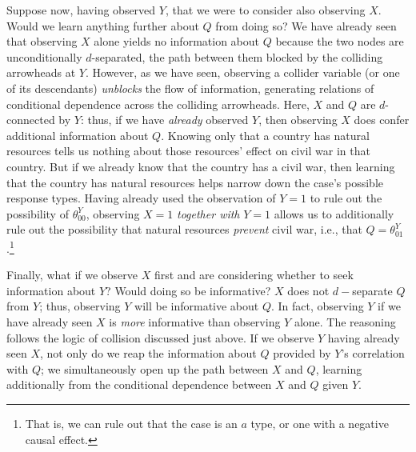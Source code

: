 \documentclass[
  12pt,
]{book}
\begin{document}
Suppose now, having observed \(Y\), that we were to consider also observing \(X\). Would we learn anything further about \(Q\) from doing so? We have already seen that observing \(X\) alone yields no information about \(Q\) because the two nodes are unconditionally \(d\)-separated, the path between them blocked by the colliding arrowheads at \(Y\). However, as we have seen, observing a collider variable (or one of its descendants) \emph{unblocks} the flow of information, generating relations of conditional dependence across the colliding arrowheads. Here, \(X\) and \(Q\) are \(d\)-connected by \(Y\): thus, if we have \emph{already} observed \(Y\), then observing \(X\) does confer additional information about \(Q\). Knowing only that a country has natural resources tells us nothing about those resources' effect on civil war in that country. But if we already know that the country has a civil war, then learning that the country has natural resources helps narrow down the case's possible response types. Having already used the observation of \(Y=1\) to rule out the possibility of \(\theta^Y_{00}\), observing \(X=1\) \emph{together with} \(Y=1\) allows us to additionally rule out the possibility that natural resources \emph{prevent} civil war, i.e., that \(Q=\theta^Y_{01}\).\footnote{That is, we can rule out that the case is an \(a\) type, or one with a negative causal effect.}

Finally, what if we observe \(X\) first and are considering whether to seek information about \(Y\)? Would doing so be informative? \(X\) does not \(d-\)separate \(Q\) from \(Y\); thus, observing \(Y\) will be informative about \(Q\). In fact, observing \(Y\) if we have already seen \(X\) is \emph{more} informative than observing \(Y\) alone. The reasoning follows the logic of collision discussed just above. If we observe \(Y\) having already seen \(X\), not only do we reap the information about \(Q\) provided by \(Y\)'s correlation with \(Q\); we simultaneously open up the path between \(X\) and \(Q\), learning additionally from the conditional dependence between \(X\) and \(Q\) given \(Y\).
\end{document}
